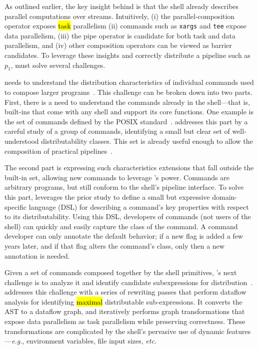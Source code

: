 \documentclass[sigplan,10pt,review,anonymous]{acmart}
\newcommand{\eg}{{\em e.g.}, }
\newcommand{\etc}{{\em etc.}\xspace}
\newcommand{\ttt}[1]{\texttt{\small #1}}
\newcommand{\todo}[1]{\hl{#1}\xspace}
\newcommand{\nv}[1]{[{\color{cyan}#1 --- nv}]}
\newcommand{\kk}[1]{[{\color{magenta}#1 --- kk}]}
\begin{document}
As outlined earlier, the key insight behind \sys is that the shell already describes parallel computations over streams.
Intuitively,
 (i) the parallel-composition operator exposes \todo{task} parallelism
 (ii) commands such as \ttt{xargs} and \ttt{tee} expose data parallelism,
 (iii) the pipe operator is candidate for both task and data parallelism, and
 (iv)  other composition operators can be viewed as barrier candidates.
To leverage these insights and correctly distribute a pipeline such as $p_1$, \sys must solve several challenges.

\sys needs to understand the distribution characteristics of individual commands used to compose larger programs~.
This challenge can be broken down into two parts.
First, there is a need to understand the commands already in the shell---that is, built-ins that come with any shell and support its core functions.
One example is the set of commands defined by the \textsc{POSIX} standard~\cite{}.
\sys addresses this part by a careful study of a group of commands, identifying a small but clear set of well-understood distributability classes.
This set is already useful enough to allow the composition of practical pipelines~.

The second part is expressing such characteristics extensions that fall outside the built-in set, allowing new commands to leverage \sys's power.
Commands are arbitrary programs, but still conform to the shell's pipeline interface.
To solve this part, \sys leverages the prior study to define a small but expressive domain-specific language (DSL) for describing a command's key properties with respect to its distributability.
Using this DSL, developers of commands (not users of the shell) can quickly and easily capture the class of the command.
A command developer can only annotate the default behavior;
  if a new flag is added a few years later, and if that flag alters the command's class, only then a new annotation is needed.

Given a set of commands composed together by the shell primitives, \sys's next challenge is to analyze it and identify candidate subexpressions for distribution~.
\sys addresses this challenge with a series of rewriting passes that perform dataflow analysis for identifying \todo{maximal} distributable sub-expressions.
It converts the AST to a dataflow graph, and iteratively performs graph transformations that expose data parallelism as task parallelism while preserving correctness.
These transformations are complicated by the shell's pervasive use of dynamic features---\eg environment variables, file input sizes, \etc
\end{document}
